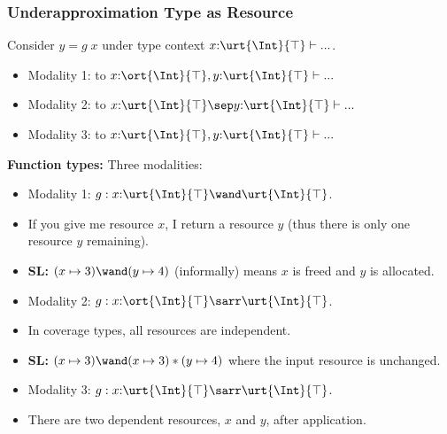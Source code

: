 \begin{frame}[fragile]
    \frametitle{Underapproximation Type as Resource}

Consider $y = g\;x$ under type context $x{:}\urt{\Int}{\top} \vdash ...$.
\begin{itemize}
    \item Modality 1: to $x{:}\ort{\Int}{\top}, y{:}\urt{\Int}{\top} \vdash ...$
    \item Modality 2: to $x{:}\urt{\Int}{\top} \sep y{:}\urt{\Int}{\top} \vdash ...$
    \item Modality 3: to $x{:}\urt{\Int}{\top}, y{:}\urt{\Int}{\top} \vdash ...$
\end{itemize}

\textbf{Function types:} Three modalities:
\begin{itemize}
    \item Modality 1: $g: x{:}\urt{\Int}{\top}\wand\urt{\Int}{\top}$. 
    \item If you give me resource $x$, I return a resource $y$ (thus there is only one resource $y$ remaining).
    \item \textbf{SL:} $(x \mapsto 3)\wand(y \mapsto 4)$ (informally) means $x$ is freed and $y$ is allocated.
    \item Modality 2: $g: x{:}\ort{\Int}{\top}\sarr\urt{\Int}{\top}$. 
    \item In coverage types, all resources are independent.
    \item \textbf{SL:} $(x \mapsto 3)\wand(x \mapsto 3) * (y \mapsto 4)$ where the input resource is unchanged.
    \item Modality 3: $g: x{:}\urt{\Int}{\top}\sarr\urt{\Int}{\top}$. 
    \item There are two dependent resources, $x$ and $y$, after application.
\end{itemize}

\end{frame}

